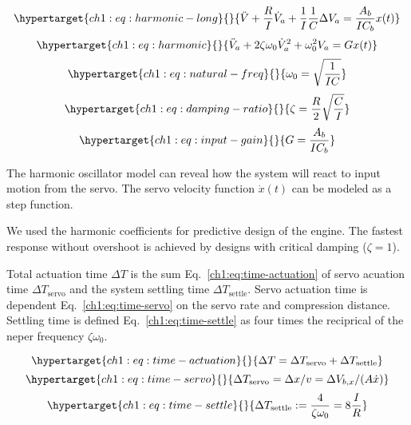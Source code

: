 \begin{equation}\protect\hypertarget{ch1:eq:harmonic-long}{}{ \ddot{V}    
+ \frac{R}{I} \dot{V}_a    
+ \frac{1}{I} \frac{1}{C} \Delta V_a    
= \frac{A_b}{I C_b} x(t)   
}\label{ch1:eq:harmonic-long}\end{equation}
\begin{equation}\protect\hypertarget{ch1:eq:harmonic}{}{ \ddot{V}_a   
+ 2\zeta \omega_0  \dot{V}_a^2   
+ \omega_0^2  V_a   
= G x(t)   
}\label{ch1:eq:harmonic}\end{equation}
\begin{equation}\protect\hypertarget{ch1:eq:natural-freq}{}{ \omega_0 =   
\sqrt{\frac{1}{IC}}   
}\label{ch1:eq:natural-freq}\end{equation}
\begin{equation}\protect\hypertarget{ch1:eq:damping-ratio}{}{ \zeta = \frac{R}{2}\sqrt{\frac{C}{I}}   
}\label{ch1:eq:damping-ratio}\end{equation}
\begin{equation}\protect\hypertarget{ch1:eq:input-gain}{}{ G = \frac{A_b}{I C_b}   
}\label{ch1:eq:input-gain}\end{equation}

The harmonic oscillator model can reveal how the system will react to
input motion from the servo. The servo velocity function \(\dot{x}(t)\)
can be modeled as a step function.

We used the harmonic coefficients for predictive design of the engine.
The fastest response without overshoot is achieved by designs with
critical damping (\(\zeta=1\)).

Total actuation time \(\Delta T\) is the sum Eq.~\ref{ch1:eq:time-actuation}
of servo acuation time \(\Delta T_\text{servo}\) and the system settling
time \(\Delta T_\text{settle}\). Servo actuation time is dependent
Eq.~\ref{ch1:eq:time-servo} on the servo rate and compression distance.
Settling time is defined Eq.~\ref{ch1:eq:time-settle} as four times the
reciprical of the neper frequency \(\zeta \omega_0\).

\begin{equation}\protect\hypertarget{ch1:eq:time-actuation}{}{ \Delta T = \Delta T_\text{servo} + \Delta T_\text{settle}   
}\label{ch1:eq:time-actuation}\end{equation}
\begin{equation}\protect\hypertarget{ch1:eq:time-servo}{}{ \Delta T_\text{servo} = \Delta x/v = \Delta V_{b,x}/(A\dot{x})   
}\label{ch1:eq:time-servo}\end{equation}
\begin{equation}\protect\hypertarget{ch1:eq:time-settle}{}{ \Delta T_\text{settle} := \frac{4}{\zeta \omega_0} = 8\frac{I}{R}   
}\label{ch1:eq:time-settle}\end{equation}

